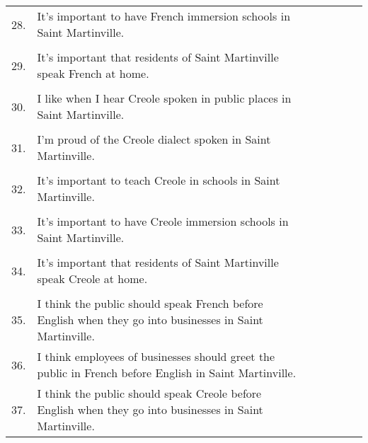 \begin{longtable}[c]{| r p{} | c | c | c | c | c |}
          &                                                                           & & & & & \\
      \hline
      28. & It's important to have French immersion schools in Saint Martinville.     & & & & & \\
          &                                                                           & & & & & \\
      \hline
      29. & It's important that residents of Saint Martinville speak French at home.  & & & & & \\
          &                                                                           & & & & & \\
      \hline
      30. & I like when I hear Creole spoken in public places in Saint Martinville.   & & & & & \\
          &                                                                           & & & & & \\
      \hline
      31. & I'm proud of the Creole dialect spoken in Saint Martinville.              & & & & & \\
          &                                                                           & & & & & \\
      \hline
      32. & It's important to teach Creole in schools in Saint Martinville.           & & & & & \\
          &                                                                           & & & & & \\
      \hline
      33. & It's important to have Creole immersion schools in Saint Martinville.     & & & & & \\
          &                                                                           & & & & & \\
      \hline
      34. & It's important that residents of Saint Martinville speak Creole at home.  & & & & & \\
          &                                                                           & & & & & \\
      \hline
      35. & I think the public should speak French before English when they go into businesses in Saint Martinville. & & & & & \\
      \hline
      36. & I think employees of businesses should greet the public in French before English in Saint Martinville. & & & & & \\
      \hline
      37. & I think the public should speak Creole before English when they go into businesses in Saint Martinville. & & & & & \\

\end{longtable}
